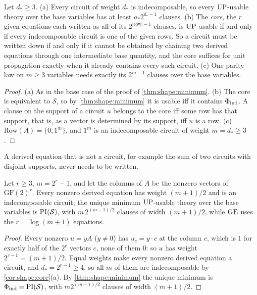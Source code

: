 \begin{corollary}\label{cor:shape:core}
Let $d_*\ge3$.
(a) Every circuit of weight $d_*$ is indecomposable, so every $\mathrm{UP}$-usable theory over the base variables has at least $a_*2^{d_*-1}$ clauses.
(b) The \emph{core}, the $r$ given equations each written as all of its $2^{\lvert\text{row}\rvert-1}$ clauses, is $\mathrm{UP}$-usable if and only if every indecomposable circuit is one of the given rows. So a circuit must be written down if and only if it cannot be obtained by chaining two derived equations through one intermediate base quantity, and the core suffices for unit propagation exactly when it already contains every such circuit.
(c) One parity law on $m\ge3$ variables needs exactly its $2^{m-1}$ clauses over the base variables.
\end{corollary}

\begin{proof}
(a) As in the base case of the proof of \cref{thm:shape:minimum}. (b) The core is equivalent to $\mathcal S$, so by \cref{thm:shape:minimum} it is usable iff it contains $\Phi_{\rm ind}$. A clause on the support of a circuit $u$ belongs to the core iff some row has that support, that is, as a vector is determined by its support, iff $u$ is a row. (c) $\mathrm{Row}(A)=\{0,1^m\}$, and $1^m$ is an indecomposable circuit of weight $m=d_*\ge3$.
\end{proof}

A derived equation that is not a circuit, for example the sum of two circuits with disjoint supports, never needs to be written.

\begin{corollary}\label{cor:shape:simplex}
Let $r\ge3$, $m=2^r-1$, and let the columns of $A$ be the nonzero vectors of $\mathrm{GF}(2)^r$. Every nonzero derived equation has weight $(m+1)/2$ and is an indecomposable circuit; the unique minimum $\mathrm{UP}$-usable theory over the base variables is $\mathrm{PI}(\mathcal S)$, with $m\,2^{(m-1)/2}$ clauses of width $(m+1)/2$, while $\mathrm{GE}$ uses the $r=\log(m+1)$ equations.
\end{corollary}

\begin{proof}
Every nonzero $u=yA$ ($y\ne0$) has $u_c=y\cdot c$ at the column $c$, which is $1$ for exactly half of the $2^r$ vectors $c$, none of them $0$: so $u$ has weight $2^{r-1}=(m+1)/2$. Equal weights make every nonzero derived equation a circuit, and $d_*=2^{r-1}\ge4$, so all $m$ of them are indecomposable by \cref{cor:shape:core}(a). By \cref{thm:shape:minimum} the unique minimum is $\Phi_{\rm ind}=\mathrm{PI}(\mathcal S)$, with $m2^{(m-1)/2}$ clauses of width $(m+1)/2$.
\end{proof}

